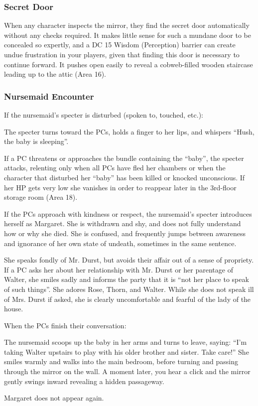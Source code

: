 \subsubsection*{Secret Door}
When any character inspects the mirror, they find the secret door automatically without any checks required.
It makes little sense for such a mundane door to be concealed so expertly, and a DC 15 Wisdom (Perception)
barrier can create undue frustration in your players, given that finding this door is necessary to continue
forward. It pushes open easily to reveal a cobweb-filled wooden staircase leading up to the attic (Area 16).

\subsubsection*{Nursemaid Encounter}
If the nursemaid's specter is disturbed (spoken to, touched, etc.):
\begin{readout}
  The specter turns toward the PCs, holds a finger to her lips, and whispers ``Hush, the baby is sleeping''.
\end{readout}
If a PC threatens or approaches the bundle containing the ``baby'', the specter attacks, relenting only when
all PCs have fled her chambers or when the character that disturbed her ``baby'' has been killed or knocked
unconscious. If her HP gets very low she vanishes in order to reappear later in the 3rd-floor storage room
(Area 18).

If the PCs approach with kindness or respect, the nursemaid's specter introduces herself as Margaret. She
is withdrawn and shy, and does not fully understand how or why she died. She is confused, and frequently
jumps between awareness and ignorance of her own state of undeath, sometimes in the same sentence.

She speaks fondly of Mr. Durst, but avoids their affair out of a sense of propriety. If a PC asks her about
her relationship with Mr. Durst or her parentage of Walter, she smiles sadly and informs the party that it
is ``not her place to speak of such things''. She adores Rose, Thorn, and Walter. While she does not speak
ill of Mrs. Durst if asked, she is clearly uncomfortable and fearful of the lady of the house.

When the PCs finish their conversation:
\begin{readout}
  The nursemaid scoops up the baby in her arms and turns to leave, saying: ``I'm taking Walter upstairs to
  play with his older brother and sister. Take care!'' She smiles warmly and walks into the main bedroom,
  before turning and passing through the mirror on the wall. A moment later, you hear a click and the mirror
  gently swings inward revealing a hidden passageway.
\end{readout}
Margaret does not appear again.

\begin{arealinks}
\end{arealinks}
